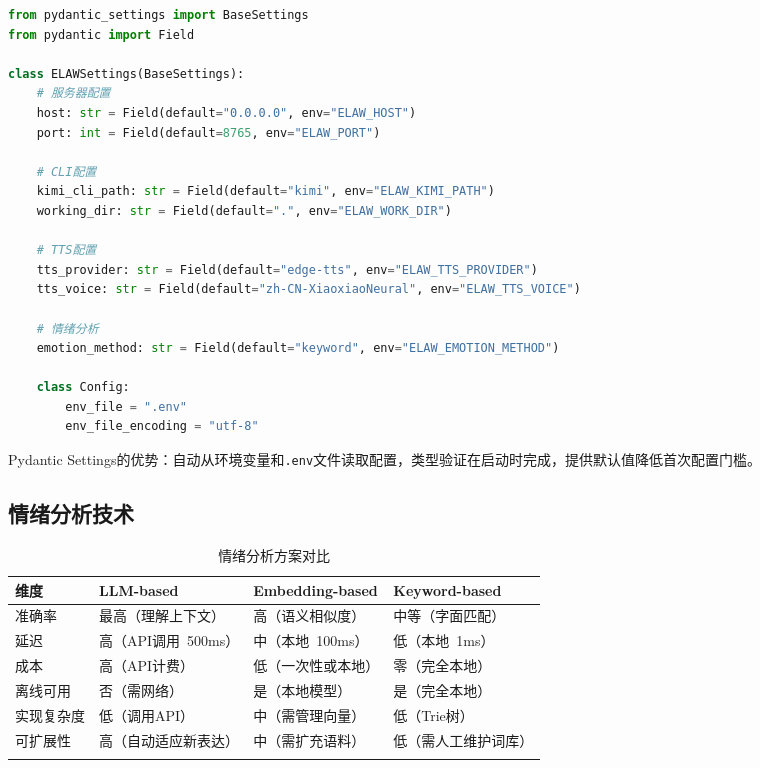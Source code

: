 \documentclass[fontset=mac,a4paper,11pt]{ctexart}
\begin{document}
\begin{lstlisting}[language=Python, caption=Pydantic Settings配置示例]
from pydantic_settings import BaseSettings
from pydantic import Field

class ELAWSettings(BaseSettings):
    # 服务器配置
    host: str = Field(default="0.0.0.0", env="ELAW_HOST")
    port: int = Field(default=8765, env="ELAW_PORT")

    # CLI配置
    kimi_cli_path: str = Field(default="kimi", env="ELAW_KIMI_PATH")
    working_dir: str = Field(default=".", env="ELAW_WORK_DIR")

    # TTS配置
    tts_provider: str = Field(default="edge-tts", env="ELAW_TTS_PROVIDER")
    tts_voice: str = Field(default="zh-CN-XiaoxiaoNeural", env="ELAW_TTS_VOICE")

    # 情绪分析
    emotion_method: str = Field(default="keyword", env="ELAW_EMOTION_METHOD")

    class Config:
        env_file = ".env"
        env_file_encoding = "utf-8"
\end{lstlisting}

Pydantic Settings的优势：自动从环境变量和\texttt{.env}文件读取配置，类型验证在启动时完成，提供默认值降低首次配置门槛。

\subsection{情绪分析技术}

\begin{table}[H]
\centering
\caption{情绪分析方案对比}
\label{tab:emotion-analysis}
\begin{tabular}{L{2.5cm}L{3.5cm}L{3.5cm}L{3.5cm}}
\toprule
\textbf{维度} & \textbf{LLM-based} & \textbf{Embedding-based} & \textbf{Keyword-based} \\
\midrule
{}
准确率 & 最高（理解上下文） & 高（语义相似度） & 中等（字面匹配） \\
延迟 & 高（API调用~500ms） & 中（本地~100ms） & 低（本地~1ms） \\
成本 & 高（API计费） & 低（一次性或本地） & 零（完全本地） \\
离线可用 & 否（需网络） & 是（本地模型） & 是（完全本地） \\
实现复杂度 & 低（调用API） & 中（需管理向量） & 低（Trie树） \\
可扩展性 & 高（自动适应新表达） & 中（需扩充语料） & 低（需人工维护词库） \\
\bottomrule
\end{tabular}
\end{table}
\end{document}
